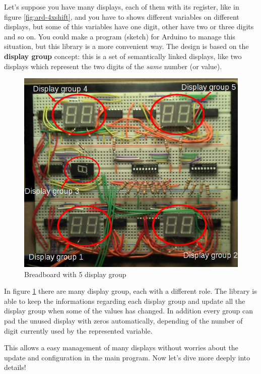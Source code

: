 \documentclass[11pt,english]{article}
\begin{document}
Let's suppose you have many displays, each of them with its register, like in figure \ref{fig:ard-4xshift},
and you have to shows different variables on different displays, but some of this variables have one 
digit, other have two or three digits and so on. You could make a program (sketch) for Arduino to 
manage this situation, but this library is a more convenient way.
The design is based on the \textbf{display group} concept: this is a set of semantically linked displays, 
like two displays which represent the two digits of the \emph{same} number (or value).
%
\begin{figure}[htb]
\centering\includegraphics[scale=0.7]{img/Dis-group}

\caption{Breadboard with 5 display group \label{fig:dis-group}}

\end{figure}

In figure \ref{fig:dis-group} there are many display group, each with a different role. The library is 
able to keep the informations regarding each display group and update all the display group when some 
of the values has changed. In addition every group can pad the unused display with zeros automatically, 
depending of the number of digit currently used by the represented variable.

This allows a easy management of many displays without worries about the update and configuration 
in the main program.
Now let's dive more deeply into details!
\end{document}
